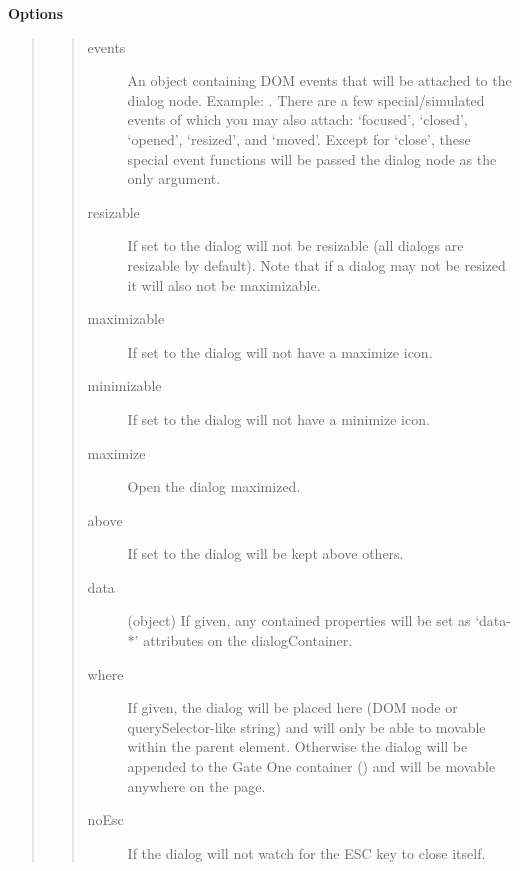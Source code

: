 \documentclass[letterpaper,10pt,openany]{sphinxmanual}
\begin{document}
\begin{fulllineitems}
\begin{fulllineitems}
\begin{fulllineitems}
\begin{quote}
\begin{description}
\begin{itemize}
\end{itemize}

\end{description}\end{quote}

\textbf{Options}
\begin{quote}
\begin{quote}\begin{description}
\item[{events}] \leavevmode
An object containing DOM events that will be attached to the dialog node.  Example: .  There are a few special/simulated events of which you may also attach: `focused', `closed', `opened', `resized', and `moved'.  Except for `close', these special event functions will be passed the dialog node as the only argument.

\item[{resizable}] \leavevmode
If set to  the dialog will not be resizable (all dialogs are resizable by default).  Note that if a dialog may not be resized it will also not be maximizable.

\item[{maximizable}] \leavevmode
If set to  the dialog will not have a maximize icon.

\item[{minimizable}] \leavevmode
If set to  the dialog will not have a minimize icon.

\item[{maximize}] \leavevmode
Open the dialog maximized.

\item[{above}] \leavevmode
If set to  the dialog will be kept above others.

\item[{data}] \leavevmode
(object) If given, any contained properties will be set as `data-*' attributes on the dialogContainer.

\item[{where}] \leavevmode
If given, the dialog will be placed here (DOM node or querySelector-like string) and will only be able to movable within the parent element.  Otherwise the dialog will be appended to the Gate One container () and will be movable anywhere on the page.

\item[{noEsc}] \leavevmode
If  the dialog will not watch for the ESC key to close itself.


\end{description}
\end{quote}
\end{quote}
\end{fulllineitems}
\end{fulllineitems}
\end{fulllineitems}
\end{document}
